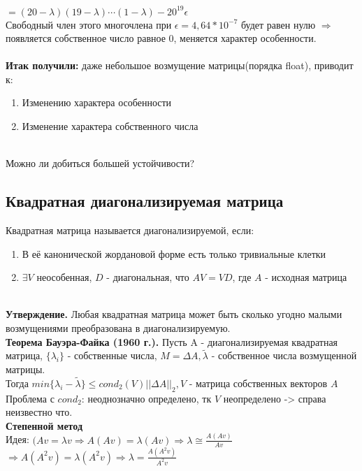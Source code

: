     \(= (20- \lambda)(19-\lambda)\cdots(1-\lambda)-20^{19}\epsilon\) \\
Свободный член этого многочлена при \(\epsilon = 4,64*10^{-7}\) будет равен нулю \(\Rightarrow\) появляется собственное число равное 0, меняется характер особенности.
\\ \\
\textbf{Итак получили:} даже небольшое возмущение матрицы(порядка float), приводит к:
    \begin{enumerate}
        \item Изменению характера особенности
        \item Изменение характера собственного числа
    \end{enumerate}
\\

    Можно ли добиться большей устойчивости?

    \subsection{Квадратная диагонализируемая матрица}
    Квадратная матрица называется диагонализируемой, если:
    \begin{enumerate}
        \item В её канонической жордановой форме есть только тривиальные клетки
        \item \(\exists V\) неособенная, \(D\) - диагональная, что \(AV = VD\), где \(A\) - исходная матрица
    \end{enumerate} \\

    \textbf{Утверждение.} Любая квадратная матрица может быть сколько угодно малыми возмущениями преобразована в диагонализируемую. \\
    
    \textbf{Теорема Бауэра-Файка (1960 г.).} Пусть A - диагонализируемая квадратная матрица, \(\{\lambda_i\}\) - собственные числа, \(M = \Delta A,\tilde{\lambda}\) - собственное числа возмущенной матрицы. \\
    Тогда \(min\{\lambda_i - \tilde{\lambda}\} \leq cond_2(V) ||\Delta A||_2 , V\) - матрица собственных векторов \(A\) \\
    Проблема с $cond_2$: неоднозначно определено, тк $V$ неопределено -> справа неизвестно что. \\
    
    \textbf{Степенной метод} \\
    Идея: $(Av = \lambda v \Rightarrow A(Av) = \lambda(Av) \Rightarrow \lambda \cong \frac{A(Av)}{Av} $ \\ $\Rightarrow $$A(A^2v) = \lambda(A^2v) \Rightarrow \lambda = \frac{A(A^2v)}{A^2v}$ \\
    
